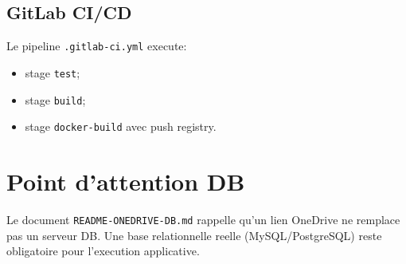\subsection*{GitLab CI/CD}
Le pipeline \texttt{.gitlab-ci.yml} execute:
\begin{itemize}[leftmargin=*]
  \item stage \texttt{test};
  \item stage \texttt{build};
  \item stage \texttt{docker-build} avec push registry.
\end{itemize}

\section{Point d'attention DB}

Le document \texttt{README-ONEDRIVE-DB.md} rappelle qu'un lien OneDrive ne remplace pas un serveur DB. Une base relationnelle reelle (MySQL/PostgreSQL) reste obligatoire pour l'execution applicative.
